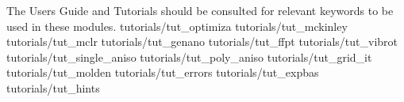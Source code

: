 The Users Guide and Tutorials should be consulted for relevant keywords to be used in these modules.
\fi
 {tutorials/tut_optimiza}
\ifmanual
 {tutorials/tut_mckinley}
 {tutorials/tut_mclr}
\fi
\ifmanual
 {tutorials/tut_genano}
\fi
\ifmanual
 {tutorials/tut_ffpt}
 {tutorials/tut_vibrot}
 {tutorials/tut_single_aniso}
 {tutorials/tut_poly_aniso}
\fi
 {tutorials/tut_grid_it}
\ifmanual
 {tutorials/tut_molden}
\fi
\ifmanual
 {tutorials/tut_errors}
\fi
 {tutorials/tut_expbas}
 {tutorials/tut_hints}

